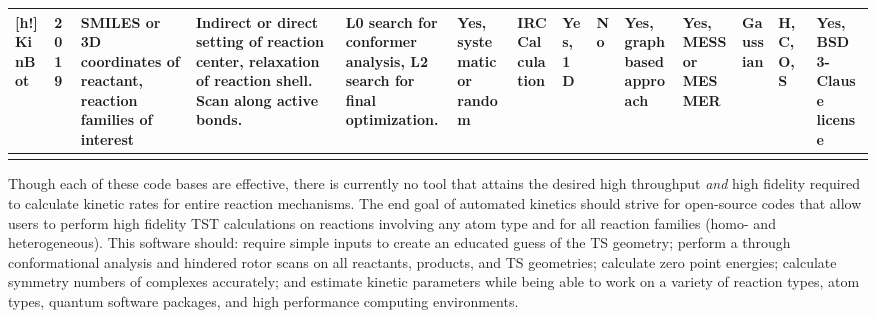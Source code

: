 \documentclass[preprint, 11pt]{elsarticle} %
\begin{document}
\begin{center}
\begin{singlespace}
\begin{adjustbox}{angle=90}
\begin{scriptsize}
\begin{tabular}{m{0.45in}||m{0.25in} | m{0.45in} | m{0.8in} | m{0.7in}| m{0.5in}| m{0.5in }|m{0.45in}| m{0.45in}| m{0.5in}| m{0.45in}| m{0.5in}| m{0.5in} | m{0.45in}}[h!]
    \hline
    KinBot  & 2019 & SMILES or 3D coordinates of reactant, reaction families of interest & Indirect or direct setting of reaction center, relaxation of reaction shell. Scan along active bonds.  & L0 search for conformer analysis, L2 search for final optimization. & Yes, systematic or random & IRC Calculation & Yes, 1D & No & Yes, graph based approach & Yes, MESS or MESMER & Gaussian & H, C, O, S & Yes, BSD 3-Clause license \\ 
    \hline
    \label{table:comparison}

\end{tabular}
\end{scriptsize}
\end{adjustbox}
\end{singlespace}
\end{center}
\restoregeometry
Though each of these code bases are effective, there is currently no tool that attains the desired high throughput \textit{and} high fidelity required to calculate kinetic rates for entire reaction mechanisms.
The end goal of automated kinetics should strive for open-source codes that allow users to perform high fidelity TST calculations on reactions involving any atom type and for all reaction families (homo- and heterogeneous).
This software should: require simple inputs to create an educated guess of the TS geometry; perform a through conformational analysis and hindered rotor scans on all reactants, products, and TS geometries; calculate zero point energies; calculate symmetry numbers of complexes accurately; and estimate kinetic parameters while being able to work on a variety of reaction types, atom types, quantum software packages, and high performance computing environments.
\end{document}
